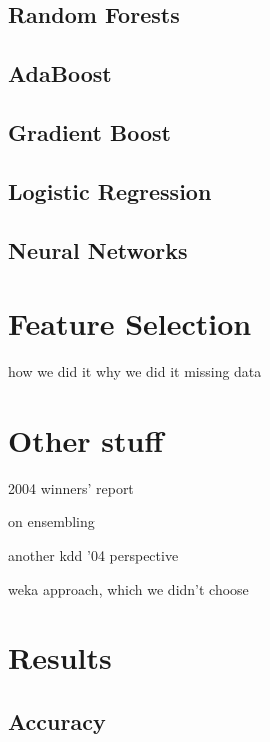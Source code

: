 \documentclass{article}
\begin{document}
\subsection{Random Forests}

\subsection{AdaBoost}

\subsection{Gradient Boost}

\subsection{Logistic Regression}

\subsection{Neural Networks}



\section{Feature Selection}
how we did it
why we did it
  missing data


\section{Other stuff}

2004 winners' report \cite{vogel2004anti}

on ensembling \cite{caruana2004ensemble}

another kdd '04 perspective \cite{caruana2004kdd}

weka approach, which we didn't choose \cite{pfahringer2004weka}


\section{Results}

\subsection{Accuracy}




\end{document}
